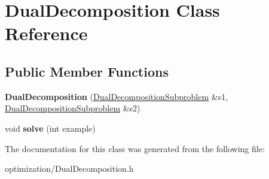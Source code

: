 \hypertarget{class_dual_decomposition}{
\section{DualDecomposition Class Reference}
\label{class_dual_decomposition}
}
\subsection*{Public Member Functions}
\begin{DoxyCompactItemize}
\item 
\hypertarget{class_dual_decomposition_a652c2229bad83ce7b135aa06ef1283a5}{
{\bfseries DualDecomposition} (\hyperlink{class_dual_decomposition_subproblem}{DualDecompositionSubproblem} \&s1, \hyperlink{class_dual_decomposition_subproblem}{DualDecompositionSubproblem} \&s2)}
\label{class_dual_decomposition_a652c2229bad83ce7b135aa06ef1283a5}

\item 
\hypertarget{class_dual_decomposition_a0013544261cba254dc2ca2c68cbb1679}{
void {\bfseries solve} (int example)}
\label{class_dual_decomposition_a0013544261cba254dc2ca2c68cbb1679}

\end{DoxyCompactItemize}


The documentation for this class was generated from the following file:\begin{DoxyCompactItemize}
\item 
optimization/DualDecomposition.h\end{DoxyCompactItemize}
